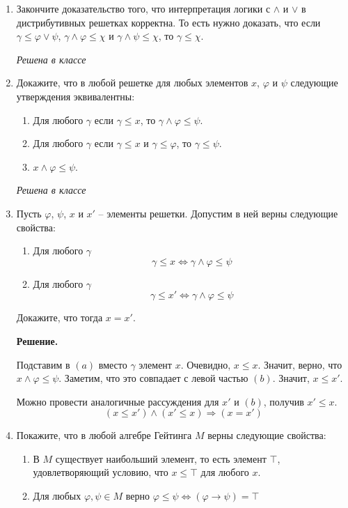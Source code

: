 \begin{enumerate}

\item Закончите доказательство того, что интерпретация логики с $\land$ и $\lor$ в дистрибутивных решетках 
корректна.
    То есть нужно доказать, что если $\gamma \leq \varphi \lor \psi$, $\gamma \land \varphi \leq \chi$ и $\gamma 
    \land \psi \leq \chi$, то $\gamma \leq \chi$.
    
    \textit{Решена в классе}

\item Докажите, что в любой решетке для любых элементов $x$, $\varphi$ и $\psi$ следующие утверждения 
эквивалентны:
\begin{enumerate}
\item Для любого $\gamma$ если $\gamma \leq x$, то $\gamma \land \varphi \leq \psi$.
\item Для любого $\gamma$ если $\gamma \leq x$ и $\gamma \leq \varphi$, то $\gamma \leq \psi$.
\item $x \land \varphi \leq \psi$.
\end{enumerate}

\textit{Решена в классе}

\item Пусть $\varphi$, $\psi$, $x$ и $x'$ -- элементы решетки. Допустим в ней верны следующие свойства:
\begin{enumerate}
\item Для любого $\gamma$
    \[ \gamma \leq x \Leftrightarrow \gamma \land \varphi \leq \psi \]
\item Для любого $\gamma$
    \[ \gamma \leq x' \Leftrightarrow \gamma \land \varphi \leq \psi \]
\end{enumerate}
Докажите, что тогда $x = x'$.

\textbf{Решение.} 

Подставим в $(a)$ вместо $\gamma$ элемент $x$. Очевидно, $x \leq x$. Значит, верно, что $x \land \varphi \leq 
\psi$. Заметим, что это совпадает с левой частью $(b)$. Значит, $x \leq x'$.

Можно провести аналогичные рассуждения для $x'$ и $(b)$, получив $x' \leq x$. 
\begin{equation*}
	(x \leq x') \land (x' \leq x) \Rightarrow (x = x')
\end{equation*}

\item Покажите, что в любой алгебре Гейтинга $M$ верны следующие свойства:
\begin{enumerate}
\item В $M$ существует наибольший элемент, то есть элемент $\top$, удовлетворяющий условию, что $x \leq \top$ для 
любого $x$.
\item Для любых $\varphi, \psi \in M$ верно $\varphi \leq \psi \Leftrightarrow (\varphi \to \psi) = \top$
\end{enumerate}


\end{enumerate}

